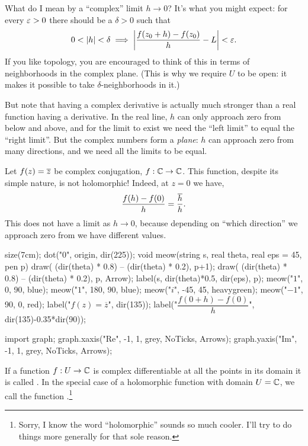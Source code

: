 What do I mean by a ``complex'' limit $h \to 0$?
It's what you might expect: for every $\varepsilon > 0$ there should be a $\delta > 0$
such that 
\[ 0 < \left\lvert h \right\rvert < \delta
	\implies
	\left\lvert \frac{f(z_0+h)-f(z_0)}{h} - L \right\rvert < \varepsilon. \]
If you like topology, you are encouraged to think of this in terms of neighborhoods in the complex plane.
(This is why we require $U$ to be open: it makes it possible to take $\delta$-neighborhoods in it.)

But note that having a complex derivative is actually much stronger
than a real function having a derivative.
In the real line, $h$ can only approach zero from below and above,
and for the limit to exist we need the ``left limit'' to equal the ``right limit''.
But the complex numbers form a \emph{plane}: $h$ can approach zero
from many directions, and we need all the limits to be equal.

\begin{example}
	Let $f(z) = \overline z$ be complex conjugation, $f : \mathbb C \to \mathbb C$.
	This function, despite its simple nature, is not holomorphic!
	Indeed, at $z=0$ we have,
	\[ \frac{f(h)-f(0)}{h} = \frac{\overline h}{h}. \]
	This does not have a limit as $h \to 0$, because depending
	on ``which direction'' we approach zero from we have different values.
	\begin{center}
		\begin{asy}
			size(7cm);
			dot("$0$", origin, dir(225));
			void meow(string s, real theta, real eps = 45, pen p) {
				draw( (dir(theta) * 0.8) -- (dir(theta) * 0.2), p+1);
				draw( (dir(theta) * 0.8) -- (dir(theta) * 0.2), p, Arrow);
				label(s, dir(theta)*0.5, dir(eps), p);
			}
			meow("$1$", 0, 90, blue);
			meow("$1$", 180, 90, blue);
			meow("$i$", -45, 45, heavygreen);
			meow("$-1$", 90, 0, red);
			label("$f(z) = \overline z$", dir(135));
			label("$\dfrac{f(0+h)-f(0)}{h}$", dir(135)-0.35*dir(90));

			import graph;
			graph.xaxis("Re", -1, 1, grey, NoTicks, Arrows);
			graph.yaxis("Im", -1, 1, grey, NoTicks, Arrows);
		\end{asy}
	\end{center}
\end{example}

If a function $f : U \to \mathbb C$ is complex differentiable
at all the points in its domain it is called .
In the special case of a holomorphic function with domain $U = \mathbb C$,
we call the function .\footnote{Sorry, I know the word ``holomorphic'' sounds so much cooler. I'll try to do things more generally for that sole reason.}

